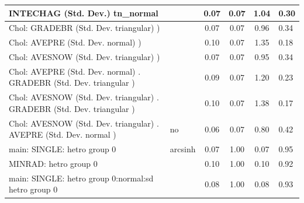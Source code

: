 \begin{table}
\begin{center}
\begin{tabular}{|l|l|c|c|c|l|}
			\hline
			INTECHAG (Std. Dev.) tn_normal &  & 0.07 & 0.07 & 1.04 & 0.30 \\
			\hline
			 Chol: GRADEBR (Std. Dev. triangular) ) &  & 0.07 & 0.07 & 0.96 & 0.34 \\
			\hline
			 Chol: AVEPRE (Std. Dev. normal) ) &  & 0.10 & 0.07 & 1.35 & 0.18 \\
			\hline
			 Chol: AVESNOW (Std. Dev. triangular) ) &  & 0.07 & 0.07 & 0.95 & 0.34 \\
			\hline
			 Chol: AVEPRE (Std. Dev. normal) . GRADEBR (Std. Dev.   triangular ) &  & 0.09 & 0.07 & 1.20 & 0.23 \\
			\hline
			 Chol: AVESNOW (Std. Dev. triangular) . GRADEBR (Std. Dev.   triangular ) &  & 0.10 & 0.07 & 1.38 & 0.17 \\
			\hline
			 Chol: AVESNOW (Std. Dev. triangular) . AVEPRE (Std. Dev.   normal ) & no & 0.06 & 0.07 & 0.80 & 0.42 \\
			\hline
			main: SINGLE: hetro group 0 & arcsinh & 0.07 & 1.00 & 0.07 & 0.95 \\
			\hline
			MINRAD: hetro group 0 &  & 0.10 & 1.00 & 0.10 & 0.92 \\
			\hline
			main: SINGLE: hetro group 0:normal:sd  hetro group 0 &  & 0.08 & 1.00 & 0.08 & 0.93 \\
			\hline
		\end{tabular}
	\end{center}
\end{table}